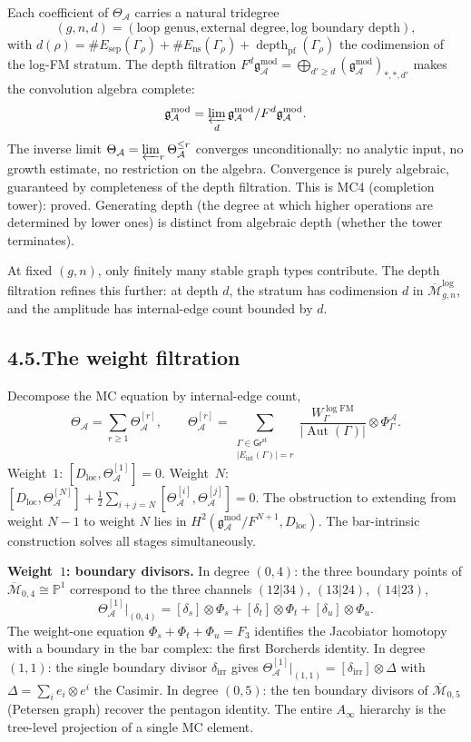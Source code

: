 \documentclass[11pt,reqno]{amsart}
\theoremstyle{definition}
\theoremstyle{remark}
\providecommand{\cA}{\mathcal{A}}
\providecommand{\cM}{\mathcal{M}}
\providecommand{\gAmod}{\mathfrak{g}^{\mathrm{mod}}_\cA}
\numberwithin{equation}{section}
\begin{document}
Each coefficient of $\Theta_\cA$ carries a natural tridegree
\[
(g,n,d)=(\text{loop genus},\text{external degree},\text{log boundary depth}),
\]
with $d(\rho)=\#E_{\mathrm{sep}}(\Gamma_\rho)+\#E_{\mathrm{ns}}(\Gamma_\rho)+\operatorname{depth}_{\mathrm{pf}}(\Gamma_\rho)$
the codimension of the log-FM stratum. The depth filtration
$F^d\gAmod=\bigoplus_{d'\ge d}(\gAmod)_{*,*,d'}$ makes the convolution
algebra complete:
\[
\gAmod=\varprojlim_d\gAmod/F^d\gAmod.
\]
The inverse limit $\Theta_\cA=\varprojlim_r\Theta_\cA^{\le r}$
converges unconditionally: no analytic input, no growth estimate, no
restriction on the algebra. Convergence is purely algebraic,
guaranteed by completeness of the depth filtration. This is MC4
(completion tower): proved. Generating depth (the degree at
which higher operations are determined by lower ones) is distinct
from algebraic depth (whether the tower terminates).

At fixed $(g,n)$, only finitely many stable graph types contribute.
The depth filtration refines this further: at depth $d$, the stratum
has codimension $d$ in $\overline{\cM}_{g,n}^{\log}$, and the
amplitude has internal-edge count bounded by $d$.

\subsection*{4.5.\enspace The weight filtration}

Decompose the MC equation by internal-edge count,
\[
\Theta_\cA=\sum_{r\ge 1}\Theta^{[r]}_\cA,\qquad\Theta^{[r]}_\cA=\sum_{\substack{\Gamma\in\mathsf{Gr}^{\mathrm{st}}\\|E_{\mathrm{int}}(\Gamma)|=r}}\frac{W^{\log\mathrm{FM}}_\Gamma}{|\operatorname{Aut}(\Gamma)|}\otimes\Phi^\cA_\Gamma.
\]
Weight~$1$: $[D_{\mathrm{loc}},\Theta^{[1]}_\cA]=0$. Weight~$N$:
$[D_{\mathrm{loc}},\Theta^{[N]}_\cA]+\tfrac12\sum_{i+j=N}[\Theta^{[i]}_\cA,\Theta^{[j]}_\cA]=0$.
The obstruction to extending from weight $N-1$ to weight $N$ lies in
$H^2(\gAmod/F^{N+1},D_{\mathrm{loc}})$. The bar-intrinsic
construction solves all stages simultaneously.

\medskip
\noindent\textbf{Weight~$1$: boundary divisors.}\enspace
In degree $(0,4)$: the three boundary points of
$\overline{\cM}_{0,4}\cong\mathbb P^1$ correspond to the three
channels $(12|34)$, $(13|24)$, $(14|23)$,
\[
\Theta^{[1]}_\cA\big|_{(0,4)}=[\delta_s]\otimes\Phi_s+[\delta_t]\otimes\Phi_t+[\delta_u]\otimes\Phi_u.
\]
The weight-one equation $\Phi_s+\Phi_t+\Phi_u=F_3$ identifies the
Jacobiator homotopy with a boundary in the bar complex: the first
Borcherds identity. In degree $(1,1)$: the single boundary divisor
$\delta_{\mathrm{irr}}$ gives
$\Theta^{[1]}_\cA|_{(1,1)}=[\delta_{\mathrm{irr}}]\otimes\Delta$ with
$\Delta=\sum_i e_i\otimes e^i$ the Casimir. In degree $(0,5)$: the
ten boundary divisors of $\overline{\cM}_{0,5}$ (Petersen graph)
recover the pentagon identity. The entire $A_\infty$ hierarchy is
the tree-level projection of a single MC element.
\end{document}
